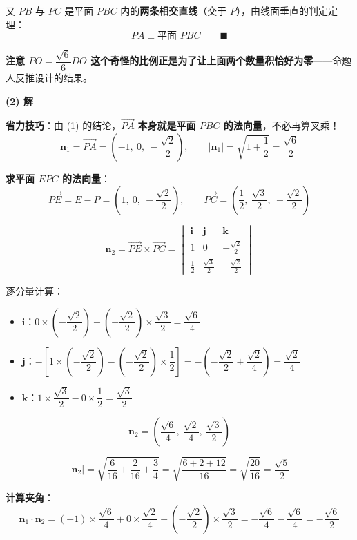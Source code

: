 又 $PB$ 与 $PC$ 是平面 $PBC$ 内的\textbf{两条相交直线}（交于 $P$），由线面垂直的判定定理：
\[PA\perp\text{平面 }PBC\qquad\blacksquare\]

\begin{gktip}
\textbf{注意 $PO=\dfrac{\sqrt6}6DO$ 这个奇怪的比例正是为了让上面两个数量积恰好为零}——命题人反推设计的结果。
\end{gktip}

\par\medskip

\textbf{(2) 解}

\textbf{省力技巧}：由 (1) 的结论，$\overrightarrow{PA}$ \textbf{本身就是平面 $PBC$ 的法向量}，不必再算叉乘！
\[\boldsymbol n_1=\overrightarrow{PA}=\left(-1,\ 0,\ -\frac{\sqrt2}2\right),\qquad \left|\boldsymbol n_1\right|=\sqrt{1+\frac12}=\frac{\sqrt6}2\]

\textbf{求平面 $EPC$ 的法向量}：
\[\overrightarrow{PE}=E-P=\left(1,\ 0,\ -\frac{\sqrt2}2\right),\qquad \overrightarrow{PC}=\left(\frac12,\ \frac{\sqrt3}2,\ -\frac{\sqrt2}2\right)\]

\[\boldsymbol n_2=\overrightarrow{PE}\times\overrightarrow{PC}=\begin{vmatrix}\boldsymbol i&\boldsymbol j&\boldsymbol k\\ 1&0&-\frac{\sqrt2}2\\ \frac12&\frac{\sqrt3}2&-\frac{\sqrt2}2\end{vmatrix}\]

逐分量计算：
\begin{itemize}
\item $\boldsymbol i$：$0\times\left(-\dfrac{\sqrt2}2\right)-\left(-\dfrac{\sqrt2}2\right)\times\dfrac{\sqrt3}2=\dfrac{\sqrt6}4$
\item $\boldsymbol j$：$-\left[1\times\left(-\dfrac{\sqrt2}2\right)-\left(-\dfrac{\sqrt2}2\right)\times\dfrac12\right]=-\left(-\dfrac{\sqrt2}2+\dfrac{\sqrt2}4\right)=\dfrac{\sqrt2}4$
\item $\boldsymbol k$：$1\times\dfrac{\sqrt3}2-0\times\dfrac12=\dfrac{\sqrt3}2$
\end{itemize}

\[\boldsymbol n_2=\left(\frac{\sqrt6}4,\ \frac{\sqrt2}4,\ \frac{\sqrt3}2\right)\]

\[\left|\boldsymbol n_2\right|=\sqrt{\frac6{16}+\frac2{16}+\frac34}=\sqrt{\frac{6+2+12}{16}}=\sqrt{\frac{20}{16}}=\frac{\sqrt5}2\]

\textbf{计算夹角}：
\[\boldsymbol n_1\cdot\boldsymbol n_2=(-1)\times\frac{\sqrt6}4+0\times\frac{\sqrt2}4+\left(-\frac{\sqrt2}2\right)\times\frac{\sqrt3}2=-\frac{\sqrt6}4-\frac{\sqrt6}4=-\frac{\sqrt6}2\]

